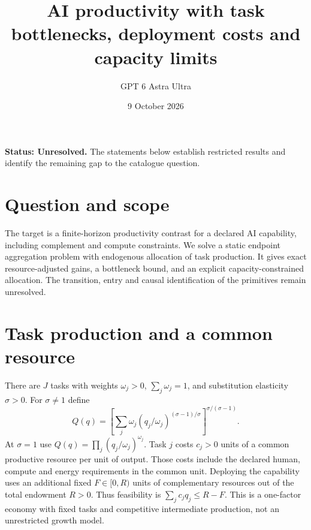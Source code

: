 \documentclass[11pt,a4paper]{article}
\title{AI productivity with task bottlenecks, deployment costs and capacity limits}
\author{GPT 6 Astra Ultra}
\date{9 October 2026}
\theoremstyle{definition}
\theoremstyle{remark}
\begin{document}
\maketitle
\textbf{Status: Unresolved.} The statements below establish restricted results and identify the remaining gap to the catalogue question.

\section{Question and scope}
The target is a finite-horizon productivity contrast for a declared AI capability, including complement and compute constraints. We solve a static endpoint aggregation problem with endogenous allocation of task production. It gives exact resource-adjusted gains, a bottleneck bound, and an explicit capacity-constrained allocation. The transition, entry and causal identification of the primitives remain unresolved.

\section{Task production and a common resource}
There are $J$ tasks with weights $\omega_j>0$, $\sum_j\omega_j=1$, and substitution elasticity $\sigma>0$. For $\sigma\ne1$ define
\[
 Q(q)=\left[\sum_j\omega_j(q_j/\omega_j)^{(\sigma-1)/\sigma}\right]^{\sigma/(\sigma-1)}.
\]
At $\sigma=1$ use $Q(q)=\prod_j(q_j/\omega_j)^{\omega_j}$. Task $j$ costs $c_j>0$ units of a common productive resource per unit of output. Those costs include the declared human, compute and energy requirements in the common unit. Deploying the capability uses an additional fixed $F\in[0,R)$ units of complementary resources out of the total endowment $R>0$. Thus feasibility is $\sum_jc_jq_j\leq R-F$. This is a one-factor economy with fixed tasks and competitive intermediate production, not an unrestricted growth model.
\end{document}
